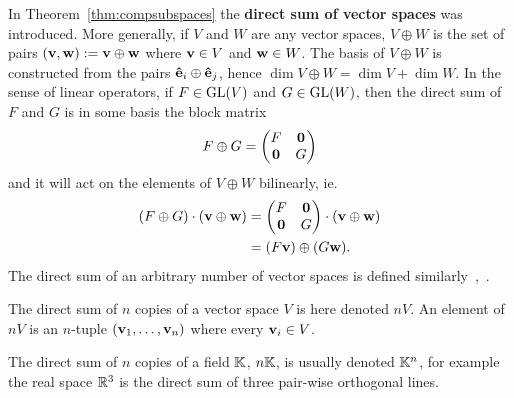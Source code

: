 In Theorem~\ref{thm:compsubspaces} the \textbf{direct sum of vector spaces} was introduced. More generally, if $V$ and $W$ are any vector spaces, $V \oplus W$ is the set of pairs $(\mathbf{v}, \mathbf{w}) := \mathbf{v} \oplus \mathbf{w}$ where $\mathbf{v} \in V$ and $\mathbf{w} \in W$. The basis of $V \oplus W$ is constructed from the pairs $\mathbf{\hat{e}}_i \oplus \mathbf{\hat{e}}_j$, hence $\dim V \oplus W = \dim V + \dim W$. In the sense of linear operators, if $F \in \text{GL}(V)$ and $G \in \text{GL}(W)$, then the direct sum of $F$ and $G$ is in some basis the block matrix
\begin{align*}
	F \oplus G = \begin{pmatrix}
	F & \mathbf{0} \\
	\mathbf{0} & G
\end{pmatrix}
\end{align*} and it will act on the elements of $V \oplus W$ bilinearly, ie. 
	\begin{align*}
			(F \oplus G) \cdot (\mathbf{v} \oplus \mathbf{w}) &= \begin{pmatrix}
					F & \mathbf{0} \\
					\mathbf{0} & G
				\end{pmatrix} \cdot (\mathbf{v} \oplus \mathbf{w})  \\
			&= (F\mathbf{v}) \oplus (G \mathbf{w}).
		\end{align*} The direct sum of an arbitrary number of vector spaces is defined similarly~\cite[Sect.1.3.]{Serre},~\cite[Sect.1.5.]{Sagan}.
		
\begin{notation}
	The direct sum of $n$ copies of a vector space $V$ is here denoted $nV$.  An element of $nV$ is an $n$-tuple $(\mathbf{v}_1, \dots, \mathbf{v}_n)$ where every $\mathbf{v}_i \in V$.
\end{notation}

\begin{example}
	The direct sum of $n$ copies of a field $\mathbb{K}$, $n\mathbb{K}$, is usually denoted $\mathbb{K}^n$, for example the real space $\mathbb{R}^3$ is the direct sum of three pair-wise orthogonal lines.
\end{example}

